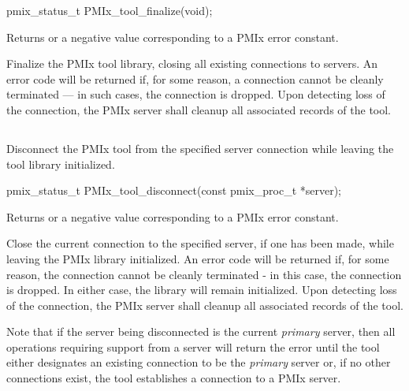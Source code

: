 \cspecificstart
\begin{codepar}
pmix_status_t
PMIx_tool_finalize(void);
\end{codepar}
\cspecificend

Returns  or a negative value corresponding to a \ac{PMIx} error constant.

\descr

Finalize the \ac{PMIx} tool library, closing all existing connections to
servers.
An error code will be returned if, for some reason, a connection cannot be
cleanly terminated --- in such cases, the connection is dropped. Upon
detecting loss of the connection, the \ac{PMIx} server shall cleanup all
associated records of the tool.


\subsection{}

\summary

Disconnect the \ac{PMIx} tool from the specified server connection while leaving the tool library initialized.

\format

\cspecificstart
\begin{codepar}
pmix_status_t
PMIx_tool_disconnect(const pmix_proc_t *server);
\end{codepar}
\cspecificend

\begin{arglist}
\end{arglist}

Returns  or a negative value corresponding to a PMIx error constant.

\descr

Close the current connection to the specified server, if one has been made, while leaving the \ac{PMIx} library initialized. An error code will be returned if, for some reason, the connection cannot be cleanly terminated - in this case, the connection is dropped. In either case, the library will remain initialized.  Upon
detecting loss of the connection, the \ac{PMIx} server shall cleanup all
associated records of the tool.


Note that if the server being disconnected is the current \emph{primary} server, then all operations requiring support from a server will return the  error until the tool either designates an existing connection to be the \emph{primary} server or, if no other connections exist, the tool establishes a connection to a \ac{PMIx} server.


